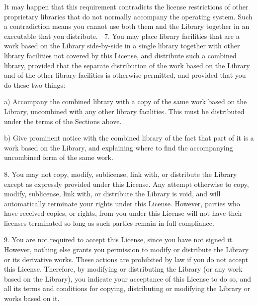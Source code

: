 \documentclass[a4paper,twoside,12pt]{book}
\begin{document}
  It may happen that this requirement contradicts the license
restrictions of other proprietary libraries that do not normally
accompany the operating system.  Such a contradiction means you cannot
use both them and the Library together in an executable that you
distribute.

  7. You may place library facilities that are a work based on the
Library side-by-side in a single library together with other library
facilities not covered by this License, and distribute such a combined
library, provided that the separate distribution of the work based on
the Library and of the other library facilities is otherwise
permitted, and provided that you do these two things:

    a) Accompany the combined library with a copy of the same work
    based on the Library, uncombined with any other library
    facilities.  This must be distributed under the terms of the
    Sections above.

    b) Give prominent notice with the combined library of the fact
    that part of it is a work based on the Library, and explaining
    where to find the accompanying uncombined form of the same work.

  8. You may not copy, modify, sublicense, link with, or distribute
the Library except as expressly provided under this License.  Any
attempt otherwise to copy, modify, sublicense, link with, or
distribute the Library is void, and will automatically terminate your
rights under this License.  However, parties who have received copies,
or rights, from you under this License will not have their licenses
terminated so long as such parties remain in full compliance.

  9. You are not required to accept this License, since you have not
signed it.  However, nothing else grants you permission to modify or
distribute the Library or its derivative works.  These actions are
prohibited by law if you do not accept this License.  Therefore, by
modifying or distributing the Library (or any work based on the
Library), you indicate your acceptance of this License to do so, and
all its terms and conditions for copying, distributing or modifying
the Library or works based on it.
\end{document}
